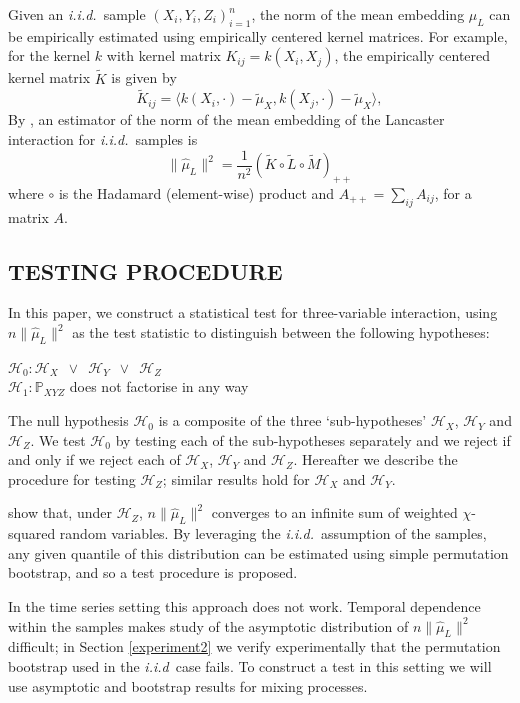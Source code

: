\documentclass[]{article}
\begin{document}
 Given an \emph{i.i.d.}~sample $(X_i,Y_i,Z_i)_{i=1}^n$, the norm of the mean embedding $\mu_L$ can be empirically estimated using empirically centered kernel matrices. For example, for the kernel $k$ with kernel matrix $K_{ij} = k(X_i,X_j)$, the empirically centered kernel matrix $\tilde{K}$ is given by
\[
\tilde{K}_{ij} = \langle k(X_i,\cdot)-\tilde{\mu}_X, k(X_j,\cdot) -\tilde{\mu}_X \rangle,
\]
 By \citet{sejdinovic2013kernel}, an estimator of the norm of the mean embedding of the Lancaster interaction for \emph{i.i.d.}~samples is 
\begin{equation}\label{eqn:lancaster}
\|\hat \mu_L\|^2 = \frac{1}{n^2}\left(\tilde{K}\circ\tilde{L}\circ\tilde{M}\right)_{++}
\end{equation}
where $\circ$ is the Hadamard (element-wise) product and $A_{++} = \sum_{ij}A_{ij}$, for a matrix $A$.


\subsection{TESTING PROCEDURE}

In this paper, we construct a statistical test for three-variable interaction, using $n\|\hat \mu_L\|^2$ as the test statistic to distinguish between the following hypotheses:

$\mathcal{H}_0: \mathcal{H}_X \enspace \lor \enspace \mathcal{H}_Y \enspace \lor \enspace \mathcal{H}_Z $\\
$\mathcal{H}_1: \mathbb{P}_{XYZ}$ does not factorise in any way


The null hypothesis $\mathcal{H}_0$ is a composite of the three `sub-hypotheses' $\mathcal{H}_X$, $\mathcal{H}_Y$ and $\mathcal{H}_Z$. We test $\mathcal{H}_0$ by testing each of the sub-hypotheses separately and we reject if and only if we reject each of $\mathcal{H}_X$, $\mathcal{H}_Y$ and $\mathcal{H}_Z$. Hereafter we describe the procedure for testing $\mathcal{H}_Z$; similar results hold for $\mathcal{H}_X$ and $\mathcal{H}_Y$.

\citet{sejdinovic2013kernel} show that, under $\mathcal{H}_Z$, $n \|\hat \mu_L\|^2 $ converges to an infinite sum of weighted $\chi$-squared random variables. By leveraging the \emph{i.i.d.}~assumption of the samples, any given quantile of this  distribution  can be estimated using simple permutation bootstrap, and so a test procedure is proposed.

In the time series setting this approach does not work. Temporal dependence within the samples makes  study of the asymptotic distribution of $n \|\hat \mu_L\|^2 $ difficult; in Section \ref{experiment2} we verify experimentally that the permutation bootstrap used in the \emph{i.i.d}~case fails. To construct a test in this setting we will use asymptotic and bootstrap results for mixing processes. 
\end{document}
